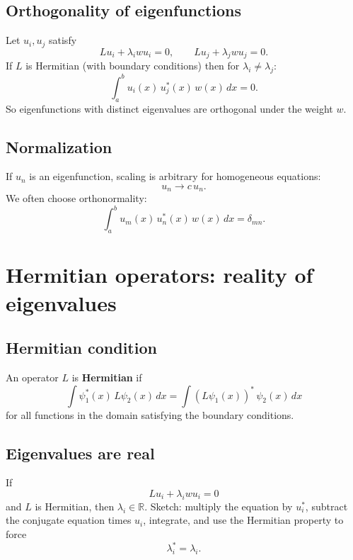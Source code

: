 \subsection{Orthogonality of eigenfunctions}
Let $u_i,u_j$ satisfy
\begin{equation}
Lu_i + \lambda_i w u_i = 0,
\qquad
Lu_j + \lambda_j w u_j = 0.
\end{equation}
If $L$ is Hermitian (with boundary conditions) then for $\lambda_i\neq \lambda_j$:
\begin{equation}
\int_a^b u_i(x)\,u_j^*(x)\,w(x)\,dx = 0.
\end{equation}
So eigenfunctions with distinct eigenvalues are orthogonal under the weight $w$.

\subsection{Normalization}
If $u_n$ is an eigenfunction, scaling is arbitrary for homogeneous equations:
\begin{equation}
u_n \to c\,u_n.
\end{equation}
We often choose orthonormality:
\begin{equation}
\int_a^b u_m(x)\,u_n^*(x)\,w(x)\,dx = \delta_{mn}.
\end{equation}


\section{Hermitian operators: reality of eigenvalues}

\subsection{Hermitian condition}
An operator $L$ is \textbf{Hermitian} if
\begin{equation}
\int \psi_1^*(x)\,L\psi_2(x)\,dx
=
\int (L\psi_1(x))^*\,\psi_2(x)\,dx
\end{equation}
for all functions in the domain satisfying the boundary conditions.

\subsection{Eigenvalues are real}
If
\begin{equation}
Lu_i + \lambda_i w u_i = 0
\end{equation}
and $L$ is Hermitian, then $\lambda_i\in\mathbb{R}$.
Sketch: multiply the equation by $u_i^*$, subtract the conjugate equation times $u_i$,
integrate, and use the Hermitian property to force
\begin{equation}
\lambda_i^* = \lambda_i.
\end{equation}

